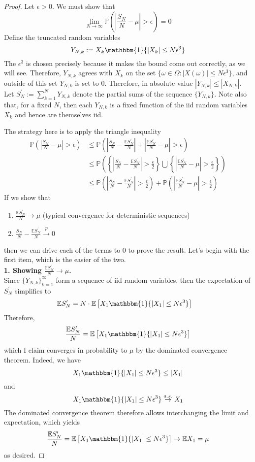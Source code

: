 \documentclass[12pt]{article}
\newcommand*{\abs}[1]{\left\lvert#1\right\rvert}
\newcommand{\E}{\mathbb{E}}
\newcommand{\Prob}{\mathbb{P}}
\begin{document}
\begin{proof}
Let $\epsilon > 0$. 
We must show that 
\[\lim_{N \to \infty} \Prob\left(\abs{\frac{S_N}{N} - \mu} > \epsilon \right) = 0\]
Define the truncated random variables 
\[Y_{N,k} := X_k \mathbbm{1}\{\abs{X_k} \leq N \epsilon^3\}\]
The $\epsilon^3$ is chosen precisely because it makes the bound come out correctly, as we will see. Therefore, $Y_{N,k}$ agrees with $X_k$ on the set
 $\{\omega \in \Omega: \abs{X(\omega)} \leq N\epsilon^3\}$, and outside of this set $Y_{N, k}$ is set to $0$. Therefore, in absolute value $\abs{Y_{N,k}} \leq \abs{X_{N,k}}$. Let $S_N^\prime := \sum_{k = 1}^{N} Y_{N,k}$
 denote the partial sums of the sequence $\{Y_{N, k}\}$. Note also that, for a fixed $N$, then each $Y_{N, k}$ is a fixed function of the iid random variables $X_k$ and hence are themselves iid.
 
 The strategy here is to apply the triangle inequality 
 \begin{align*}
 \Prob\left(\abs{\frac{S_N}{N} - \mu} > \epsilon \right) &\leq \Prob\left(\abs{\frac{S_N}{N} - \frac{\E S^\prime_N}{N} } + \abs{\frac{\E S^\prime_N}{N}  - \mu} > \epsilon \right) \\
 										&\leq \Prob\left(\left\{\abs{\frac{S_N}{N} - \frac{\E S^\prime_N}{N} } > \frac{\epsilon}{2} \right\} \bigcup \left\{\abs{\frac{\E S^\prime_N}{N}  - \mu} > \frac{\epsilon}{2}\right\} \right) \\
										&\leq \Prob\left(\abs{\frac{S_N}{N} - \frac{\E S^\prime_N}{N} } > \frac{\epsilon}{2}\right) + \Prob\left(\abs{\frac{\E S^\prime_N}{N}  - \mu} > \frac{\epsilon}{2}\right)
 \end{align*}
 If we show that 
 \begin{enumerate}
 \item $\frac{\E S_N^\prime}{N} \to \mu$ (typical convergence for deterministic sequences)
 \item $\frac{S_N}{N} - \frac{\E S_N^\prime}{N} \overset{p}{\to} 0$
 \end{enumerate}
 then we can drive each of the terms to $0$ to prove the result. Let's begin with the first item, which is the easier of the two. \\
 
 \bigskip
 \noindent
 \textbf{1. Showing $\frac{\E S_N^\prime}{N} \to \mu$.} \\
 Since $\{Y_{N,k}\}_{k = 1}^{\infty}$ form a sequence of iid random variables, then the expectation of $S_N^\prime$ simplifies to 
 \begin{align*}
 \E S_N^\prime &= N \cdot \E\left[X_1 \mathbbm{1}\{\abs{X_1} \leq N\epsilon^3\} \right]
 \end{align*}
 Therefore, 
 \[\frac{\E S_N^\prime}{N} = \E\left[X_1 \mathbbm{1}\{\abs{X_1} \leq N\epsilon^3\}\right]\]
 which I claim converges in probability to $\mu$ by the dominated convergence theorem. Indeed, we have 
 \[X_1 \mathbbm{1}\{\abs{X_1} \leq N\epsilon^3\} \leq \abs{X_1}\]
 and 
 \[X_1 \mathbbm{1}\{\abs{X_1} \leq N\epsilon^3\} \overset{a.s.}{\to} X_1 \]
 The dominated convergence theorem therefore allows interchanging the limit and expectation, which yields
 \[\frac{\E S_N^\prime}{N} = \E\left[X_1 \mathbbm{1}\{\abs{X_1} \leq N\epsilon^3\}\right] \to \E X_1 = \mu \]
 as desired. 
 

\end{proof}
\end{document}

